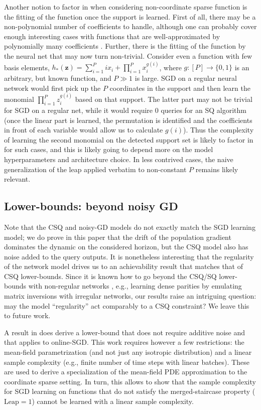\documentclass[11pt]{article}
\newcommand{\<}{\langle}
\renewcommand{\>}{\rangle}
\theoremstyle{definition}
\def\bz{{\boldsymbol z}}
\def\bz{{\boldsymbol z}}
\def\bz{{\boldsymbol z}}
\begin{document}
Another notion to factor in when considering non-coordinate sparse function is the fitting of the function once the support is learned. First of all, there may be a non-polynomial number of coefficients to handle, although one can probably cover enough interesting cases with functions that are well-approximated by polynomially many coefficients \citep{odonnell_2014}. Further, there is the fitting of the function by the neural net that may now turn non-trivial. Consider even a function with few basis elements, $h_*(\bz) = \sum_{i=1}^P ix_i + \prod_{i=1}^P x_i^{g(i)}$, where $g : [P] \to \{0,1\}$ is an arbitrary, but known function, and $P \gg 1$ is large. SGD on a regular neural network would first pick up the $P$ coordinates in the support and then learn the monomial $\prod_{i=1}^P z_i^{g(i)}$ based on that support. The latter part may not be trivial for SGD on a regular net, while it would require 0 queries for an SQ algorithm (once the linear part is learned, the permutation is identified and the coefficients in front of each variable would allow us to calculate $g(i)$). Thus the complexity of learning the second monomial on the detected support set is likely to factor in for such cases, and this is likely going to depend more on the model hyperparameters and architecture choice. In less contrived cases, the naive generalization of the leap applied verbatim to non-constant $P$ remains likely relevant.

\subsection{Lower-bounds: beyond noisy GD}\label{app:beyond_CSQ}
Note that the CSQ and noisy-GD models do not exactly match the SGD learning model; we do prove in this paper that the drift of the population gradient dominates the dynamic on the considered horizon, but the CSQ model also has noise added to the query outputs. It is nonetheless interesting that the regularity of the network model drives us to an achievability result that matches that of CSQ lower-bounds. Since it is known how to go beyond the CSQ/SQ lower-bounds with non-regular networks \cite{abbe2020universality}, e.g., learning dense parities by emulating matrix inversions with irregular networks, our results raise an intriguing question: may the model ``regularity'' act comparably to a CSQ constraint? We leave this to future work.

A result in  \cite{abbe2022merged} does derive a lower-bound that does not require additive noise and that applies to  online-SGD. This work requires however a few restrictions: the mean-field parametrization (and not just any isotropic distribution) and a linear sample complexity (e.g.,  finite number of time steps with linear batches). These are used to derive a specialization of the mean-field PDE approximation \citep{mei2018mean} to the coordinate sparse setting. In turn, this allows to show that the sample complexity for SGD learning on functions that do not satisfy the merged-staircase property ($\mathrm{Leap}=1$) cannot be learned with a linear sample complexity.
\end{document}
